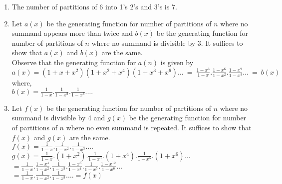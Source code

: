 \documentclass[a4paper]{article}
\begin{document}
\begin{enumerate}

\item The number of partitions of 6 into 1's 2's and 3's is 7. 

\item Let $a(x)$ be the generating function for number of partitions of $n$ where no summand appears more than twice and $b(x)$ be the generating function for number of partitions of $n$ where no
summand is divisible by 3. It suffices to show that $a(x)$ and $b(x)$ are the same.\\
 Observe that the generating function for $a(n)$ is given by \\
  $a(x) = (1+x+x^2)(1+x^2+x^4)(1+x^3+x^6)\dots ~=~ \frac{1-x^3}{1-x}.\frac{1-x^6}{1-x^2}.\frac{1-x^9}{1-x^3}\dots ~=~b(x)$ where,\\
  $b(x)= \frac{1}{1-x}.\frac{1}{1-x^2}.\frac{1}{1-x^3}. \dots$
 
 

\item Let $f(x)$ be the generating function for number of partitions of $n$ where no summand is divisible by 4 and $g(x)$ be the generating function for number of partitions of $n$ where no even 
summand is repeated. It suffices to show that $f(x)$ and $g(x)$ are the same.\\
 $f(x)= \frac{1}{1-x}.\frac{1}{1-x^2}.\frac{1}{1-x^3}. \dots$\\
 $g(x)= \frac{1}{1-x}.(1+x^2).\frac{1}{1-x^3}.(1+x^4).\frac{1}{1-x^5}.(1+x^6) \dots$\\
 $= \frac{1}{1-x}.\frac{1-x^4}{1-x^2}.\frac{1}{1-x^3}.\frac{1-x^6}{1-x^4}.\frac{1}{1-x^5}.\frac{1-x^{12}}{1-x^{6}} \dots $\\ 
 $=\frac{1}{1-x}.\frac{1}{1-x^2}.\frac{1}{1-x^3}. \dots = f(x) $
 


\end{enumerate}
\end{document}
